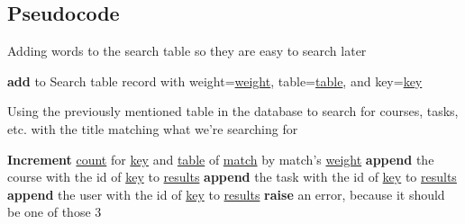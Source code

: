 \newpage
\subsection{Pseudocode}

\begin{algorithm}
  \caption{Adding words to the search table so they are easy to search later}\label{addline}
  \begin{algorithmic}[1]
  			\LState \textbf{add} to Search table record with weight=\underline{weight}, table=\underline{table}, and key=\underline{key}
  		\EndFor
  	\EndProcedure
  \end{algorithmic}
\end{algorithm}

\begin{algorithm}
  \caption{Using the previously mentioned table in the database to search for courses, tasks, etc. with the title matching what we're searching for}\label{search}
  \begin{algorithmic}[1]
        			\LState \textbf{Increment} \underline{count} for \underline{key} and \underline{table} of \underline{match} by match's \underline{weight}
        		\EndFor
        \EndFor
        		 
        			\LState \textbf{append} the course with the id of \underline{key} to \underline{results}
        		 
        			\LState \textbf{append} the task with the id of \underline{key} to \underline{results}
        		 
        			\LState \textbf{append} the user with the id of \underline{key} to \underline{results}
        		\Else
        			\LState \textbf{raise} an error, because it should be one of those 3
        		\EndIf
        \EndFor
        \LState {}
    \EndProcedure
  \end{algorithmic}
\end{algorithm}